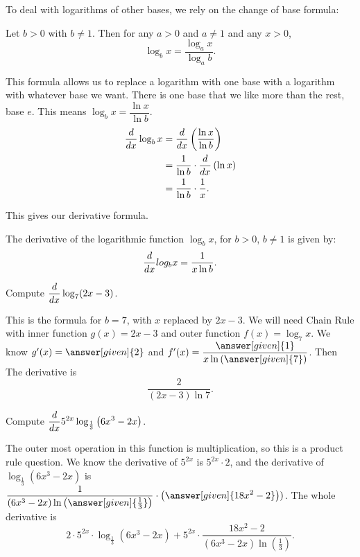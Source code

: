 \documentclass{ximera}
\begin{document}
To deal with logarithms of other bases, we rely on the change of base formula:
\begin{theorem}
	Let $b > 0$ with $b \neq 1$.  Then for any $a > 0$ and $a \neq 1$ and any $x > 0$,
	\[ \log_b x = \dfrac{\log_a x  }{ \log_a b }. \]
\end{theorem}

This formula allows us to replace a logarithm with one base with a logarithm with whatever base we want.  There is one base that we like more than the
rest, base $e$.  This means $\displaystyle \log_b x = \dfrac{ \ln x}{ \ln b}$. 
\begin{align*}
	\frac{d}{\mathop{}\!d x} \log_b x &= \frac{d}{\mathop{}\!d x} \left( \dfrac{ \ln x }{\ln b} \right)\\
		&= \dfrac{1}{\ln b} \cdot \frac{d}{\mathop{}\!d x}\left( \ln x \right) \\
		&= \dfrac{1}{\ln b} \cdot \dfrac{1}{x}.
\end{align*}

This gives our derivative formula.
\begin{theorem}
	The derivative of the logarithmic function $\log_b x$, for $b > 0$, $b \neq 1$ is given by:
	\[ \frac{d}{\mathop{}\!d x} log_b x = \dfrac{1}{x \ln b}. \]
\end{theorem}

\begin{example}
	Compute $\displaystyle \frac{d}{\mathop{}\!d x} \log_7(2x-3)$.
	\begin{explanation}
		This is the formula for $b=7$, with $x$ replaced by $2x-3$.  We will need Chain Rule with inner function $g(x) = 2x-3$ and outer function $f(x) = \log_7 x$.
		We know $g'(x) = \answer[given]{2}$ and $f'(x) = \dfrac{\answer[given]{1}}{x \ln\left( \answer[given]{7} \right)}$.  Then
		The derivative is \[ \dfrac{2}{(2x-3) \ln 7}. \]
	\end{explanation}
\end{example}

\begin{example}
	Compute $\displaystyle \frac{d}{\mathop{}\!d x} 5^{2x} \log_{\frac{1}{3}}\left( 6x^3-2x\right)$.
	\begin{explanation}
		The outer most operation in this function is multiplication, so this is a product rule question.  We know the derivative of $5^{2x}$ is $5^{2x} \cdot 2$, and the derivative of
		$\log_{\frac{1}{3}}\left(6x^3 - 2x \right)$ is $\displaystyle \dfrac{1}{(6x^3-2x) \ln\left(\answer[given]{\frac{1}{3}}\right)} \cdot \left(\answer[given]{18x^2-2}\right))$.  The whole derivative is
		\[ 2 \cdot 5^{2x}\cdot \log_{\frac{1}{3}}\left( 6x^3-2x\right) + 5^{2x}\cdot \dfrac{18x^2-2}{(6x^3-2x)\ln\left(\frac{1}{3}\right)} . \]
	\end{explanation}
\end{example}
\end{document}
